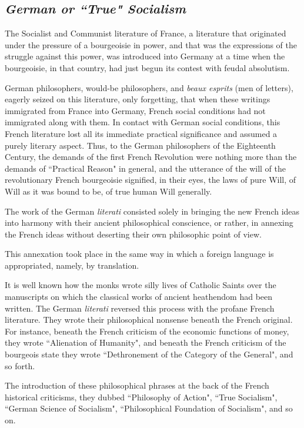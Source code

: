 \subsection{\itshape German or ``True" Socialism}

The Socialist and Communist literature of France, a literature that originated under the pressure of a bourgeoisie in power, and that was the expressions of the struggle against this power, was introduced into Germany at a time when the bourgeoisie, in that country, had just begun its contest with feudal absolutism. 

German philosophers, would-be philosophers, and \emph{beaux esprits} (men of letters), eagerly seized on this literature, only forgetting, that when these writings immigrated from France into Germany, French social conditions had not immigrated along with them. In contact with German social conditions, this French literature lost all its immediate practical significance and assumed a purely literary aspect. Thus, to the German philosophers of the Eighteenth Century, the demands of the first French Revolution were nothing more than the demands of ``Practical Reason" in general, and the utterance of the will of the revolutionary French bourgeoisie signified, in their eyes, the laws of pure Will, of Will as it was bound to be, of true human Will generally. 

The work of the German \emph{literati} consisted solely in bringing the new French ideas into harmony with their ancient philosophical conscience, or rather, in annexing the French ideas without deserting their own philosophic point of view. 

This annexation took place in the same way in which a foreign language is appropriated, namely, by translation. 

It is well known how the monks wrote silly lives of Catholic Saints over the manuscripts on which the classical works of ancient heathendom had been written. The German \emph{literati} reversed this process with the profane French literature. They wrote their philosophical nonsense beneath the French original. For instance, beneath the French criticism of the economic functions of money, they wrote ``Alienation of Humanity", and beneath the French criticism of the bourgeois state they wrote ``Dethronement of the Category of the General", and so forth. 

The introduction of these philosophical phrases at the back of the French historical criticisms, they dubbed ``Philosophy of Action", ``True Socialism", ``German Science of Socialism", ``Philosophical Foundation of Socialism", and so on. 

